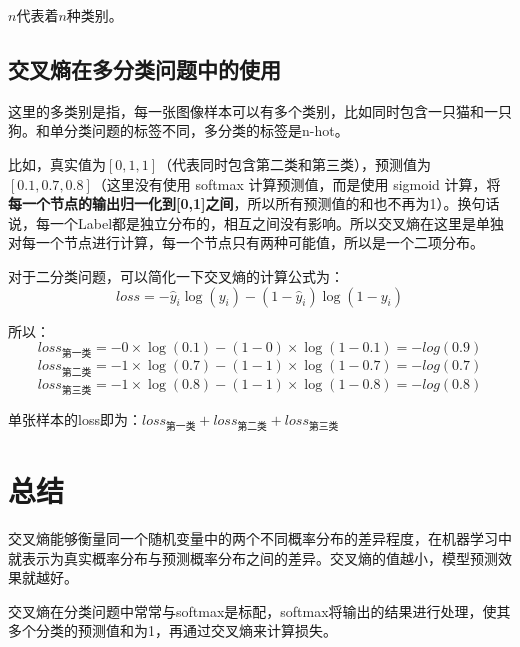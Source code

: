 \documentclass[12pt]{article}
\begin{document}
$n$代表着$n$种类别。

\subsection{交叉熵在多分类问题中的使用}
这里的多类别是指，每一张图像样本可以有多个类别，比如同时包含一只猫和一只狗。和单分类问题的标签不同，多分类的标签是n-hot。

比如，真实值为$[0,1,1]$（代表同时包含第二类和第三类），预测值为$[0.1, 0.7, 0.8]$（这里没有使用 softmax 计算预测值，而是使用 sigmoid 计算，将\textbf{每一个节点的输出归一化到[0,1]之间}，所以所有预测值的和也不再为1）。换句话说，每一个Label都是独立分布的，相互之间没有影响。所以交叉熵在这里是单独对每一个节点进行计算，每一个节点只有两种可能值，所以是一个二项分布。

对于二分类问题，可以简化一下交叉熵的计算公式为：
$$
loss = -{\hat y_i}\log(y_i) - (1-\hat y_i)\log{(1-y_i)}
$$

所以：
$$
loss_{\text{第一类}} = -0\times\log(0.1) - (1-0)\times\log(1-0.1) = -log(0.9) 
$$
$$
loss_{\text{第二类}} = -1\times\log(0.7) - (1-1)\times\log(1-0.7) = -log(0.7) 
$$
$$
loss_{\text{第三类}} = -1\times\log(0.8) - (1-1)\times\log(1-0.8) = -log(0.8) 
$$

单张样本的loss即为：$loss_{\text{第一类}} +loss_{\text{第二类}} + loss_{\text{第三类}}$

\section{总结}
交叉熵能够衡量同一个随机变量中的两个不同概率分布的差异程度，在机器学习中就表示为真实概率分布与预测概率分布之间的差异。交叉熵的值越小，模型预测效果就越好。

交叉熵在分类问题中常常与softmax是标配，softmax将输出的结果进行处理，使其多个分类的预测值和为1，再通过交叉熵来计算损失。



\end{document}
